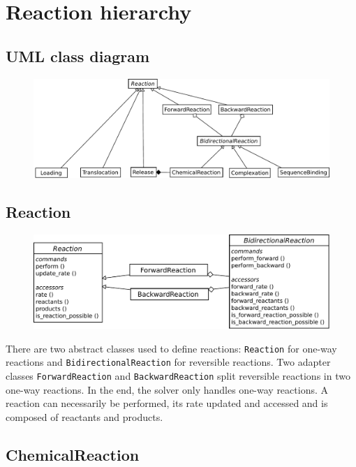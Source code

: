 \documentclass[12pt]{article}
\theoremstyle{definition}
\theoremstyle{remark}
\numberwithin{equation}{section}
\begin{document}
\section{Reaction hierarchy}

\subsection{UML class diagram}

\begin{figure}[!ht]
	\centering
	\includegraphics[width=0.8\linewidth]{reaction_uml}
\end{figure}

\subsection{Reaction}

\begin{figure}[!ht]
	\centering
	\includegraphics[width=0.8\linewidth]{reaction}
\end{figure}

There are two abstract classes used to define reactions: \texttt{Reaction} for one-way reactions and \texttt{BidirectionalReaction} for reversible reactions. Two adapter classes \texttt{ForwardReaction} and \texttt{BackwardReaction} split reversible reactions in two one-way reactions. In the end, the solver only handles one-way reactions. A reaction can necessarily be performed, its rate updated and accessed and is composed of reactants and products.

\subsection{ChemicalReaction}
\end{document}

